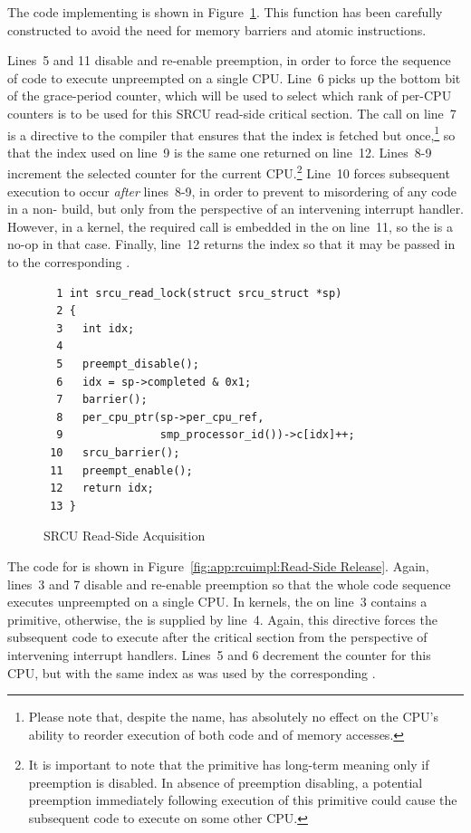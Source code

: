 The code implementing  is shown in
Figure~\ref{fig:app:rcuimpl:Read-Side Acquisition}.
This function has been carefully constructed to avoid the
need for memory barriers and atomic instructions.

Lines~5 and 11 disable and re-enable preemption, in order to force
the sequence of code to execute unpreempted on a single CPU.
Line~6 picks up the bottom bit of the grace-period counter, which will
be used to select which rank of per-CPU counters is to be used for this
SRCU read-side critical section.
The  call on line~7 is a directive to the compiler
that ensures that the index is
fetched but once,\footnote{
	Please note that, despite the name, 
	has absolutely no effect on the CPU's ability to
	reorder execution of both code and of memory accesses.}
so that the index used on line~9 is the same
one returned on line~12.
Lines~8-9 increment the selected counter for the current CPU.\footnote{
	It is important to note that the  primitive
	has long-term meaning only if preemption is disabled.
	In absence of preemption disabling, a potential preemption
	immediately following execution of this primitive could
	cause the subsequent code to execute on some other CPU.}
Line~10 forces subsequent execution to occur \emph{after}
lines~8-9, in order to prevent to misordering of any code
in a non- build, but only
from the perspective of an intervening interrupt handler.
However, in a  kernel, the required 
call is embedded in the  on line~11, so the
 is a no-op in that case.
Finally, line~12 returns the index so that it may be passed in to the
corresponding .

\begin{figure}[htbp]
{ \scriptsize
\begin{verbatim}
  1 int srcu_read_lock(struct srcu_struct *sp)
  2 {
  3   int idx;
  4
  5   preempt_disable();
  6   idx = sp->completed & 0x1;
  7   barrier();
  8   per_cpu_ptr(sp->per_cpu_ref,
  9               smp_processor_id())->c[idx]++;
 10   srcu_barrier();
 11   preempt_enable();
 12   return idx;
 13 }
\end{verbatim}
}
\caption{SRCU Read-Side Acquisition}
\label{fig:app:rcuimpl:Read-Side Acquisition}
\end{figure}

The code for  is shown in
Figure~\ref{fig:app:rcuimpl:Read-Side Release}.
Again, lines~3 and 7 disable and re-enable preemption so that the
whole code sequence executes unpreempted on a single CPU.
In  kernels, the  on line~3
contains a  primitive, otherwise, the 
is supplied by line~4.
Again, this directive forces the subsequent code to execute after
the critical section from the perspective of intervening
interrupt handlers.
Lines~5 and 6 decrement the counter for this CPU, but with the same
index as was used by the corresponding .

